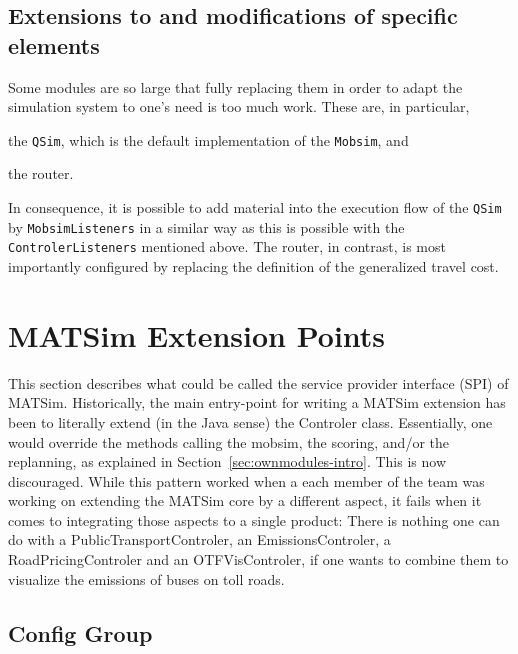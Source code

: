 \subsection{Extensions to and modifications of specific elements}

Some modules are so large that fully replacing them in order to adapt the simulation system to one's need is too much work.  These are, in particular,
\begin{compactitem}
\item the \verb$QSim$, which is the default implementation of the \verb$Mobsim$, and
\item the router.
\end{compactitem}
In consequence, it is possible to add material into the execution flow of the \verb$QSim$ by \verb$MobsimListeners$ in a similar way as this is possible with the \verb$ControlerListeners$ mentioned above.
%
The router, in contrast, is most importantly configured by replacing the definition of the generalized travel cost. 

\section{MATSim Extension Points}
This section describes what could be called the service provider interface (SPI) of MATSim.
Historically, the main entry-point for writing a MATSim extension has been to literally extend (in the Java sense)
the Controler class.  Essentially, one would override the methods calling the mobsim, the scoring, and/or the replanning, as explained in Section~\ref{sec:ownmodules-intro}.  This is now discouraged. While this pattern worked when a each member of the team
was working on extending the MATSim core by a different aspect, it fails when it comes to
integrating those aspects to a single product: There is nothing one can do with a PublicTransportControler, an EmissionsControler, a RoadPricingControler and an OTFVisControler,
if one wants to combine them to visualize the emissions of buses on toll roads.

\subsection{Config Group}
\label{sec:config}


